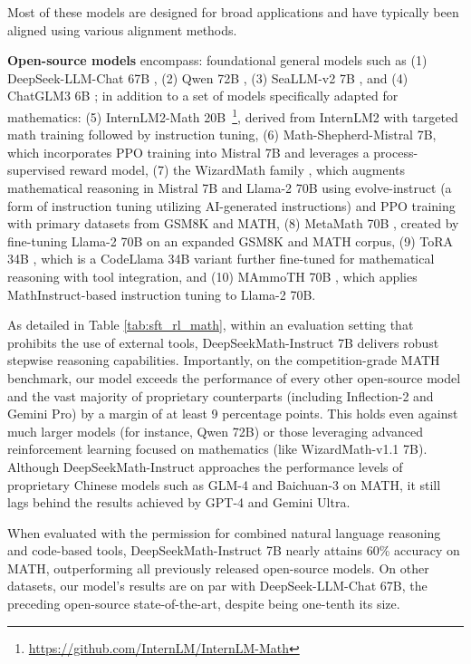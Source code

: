 Most of these models are designed for broad applications and have typically been aligned using various alignment methods.

\item \textbf{Open-source models} encompass: foundational general models such as (1) DeepSeek-LLM-Chat 67B \citep{deepseek-llm}, (2) Qwen 72B \citep{qwen}, (3) SeaLLM-v2 7B \citep{seallm}, and (4) ChatGLM3 6B \citep{chatglm3}; in addition to a set of models specifically adapted for mathematics: (5) InternLM2-Math 20B~\footnote{\url{https://github.com/InternLM/InternLM-Math}}, derived from InternLM2 with targeted math training followed by instruction tuning, (6) Math-Shepherd-Mistral 7B, which incorporates PPO training \citep{schulman2017proximal} into Mistral 7B \citep{mistral} and leverages a process-supervised reward model, (7) the WizardMath family \citep{wizardmath}, which augments mathematical reasoning in Mistral 7B and Llama-2 70B \citep{llama2} using evolve-instruct (a form of instruction tuning utilizing AI-generated instructions) and PPO training with primary datasets from GSM8K and MATH, (8) MetaMath 70B \citep{metamath}, created by fine-tuning Llama-2 70B on an expanded GSM8K and MATH corpus, (9) ToRA 34B \cite{tora}, which is a CodeLlama 34B variant further fine-tuned for mathematical reasoning with tool integration, and (10) MAmmoTH 70B \citep{MathInstruct}, which applies MathInstruct-based instruction tuning to Llama-2 70B.

As detailed in Table \ref{tab:sft_rl_math}, within an evaluation setting that prohibits the use of external tools, DeepSeekMath-Instruct 7B delivers robust stepwise reasoning capabilities. Importantly, on the competition-grade MATH benchmark, our model exceeds the performance of every other open-source model and the vast majority of proprietary counterparts (including Inflection-2 and Gemini Pro) by a margin of at least 9 percentage points. This holds even against much larger models (for instance, Qwen 72B) or those leveraging advanced reinforcement learning focused on mathematics (like WizardMath-v1.1 7B). Although DeepSeekMath-Instruct approaches the performance levels of proprietary Chinese models such as GLM-4 and Baichuan-3 on MATH, it still lags behind the results achieved by GPT-4 and Gemini Ultra.

When evaluated with the permission for combined natural language reasoning and code-based tools, DeepSeekMath-Instruct 7B nearly attains 60\% accuracy on MATH, outperforming all previously released open-source models. On other datasets, our model's results are on par with DeepSeek-LLM-Chat 67B, the preceding open-source state-of-the-art, despite being one-tenth its size.

